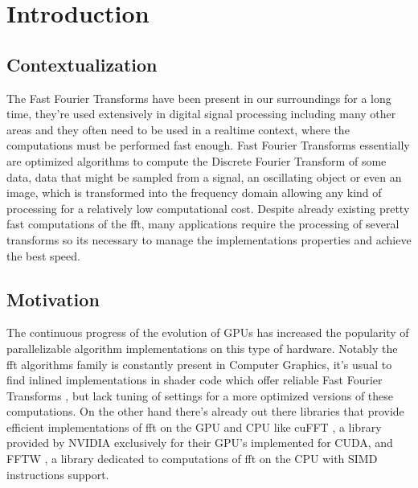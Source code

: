 \documentclass[
  oneside,
  11pt, a4paper,
  footinclude=true,
  headinclude=true,
  cleardoublepage=empty
]{scrbook}
\begin{document}
    \cleardoublepage
    \lstlistoflistings

    \printglossary[type=\acronymtype]
    
    \cleardoublepage
    \setcounter{page}{5}


\chapter{Introduction} \label{chap:introduction}

\section{Contextualization} \label{sec:contextualization}

The Fast Fourier Transforms have been present in our surroundings for a long time, they're used extensively in digital signal processing including many other areas and they often need to be used in a realtime context, where the computations must be performed fast enough. Fast Fourier Transforms essentially are optimized algorithms to compute the Discrete Fourier Transform of some data, data that might be sampled from a signal, an oscillating object or even an image, which is transformed into the frequency domain allowing any kind of processing for a relatively low computational cost. Despite already existing pretty fast computations of the \acrshort{fft}, many applications require the processing of several transforms so its necessary to manage the implementations properties and achieve the best speed.


\section{Motivation} \label{sec:motivation}

The continuous progress of the evolution of GPUs has increased the popularity of parallelizable algorithm implementations on this type of hardware.
Notably the \acrshort{fft} algorithms family is constantly present in Computer Graphics, it's usual to find inlined implementations in shader code which offer reliable Fast Fourier Transforms \cite{flugge2017realtime}, but lack tuning of settings for a more optimized versions of these computations. On the other hand there's already out there libraries that provide efficient implementations of \acrshort{fft} on the GPU and CPU like cuFFT \cite{nvidiacufft}, a library provided by NVIDIA exclusively for their GPU's implemented for CUDA, and FFTW \cite{frigo2012fftw}, a library dedicated to computations of \acrshort{fft} on the CPU with SIMD instructions support.
\end{document}
